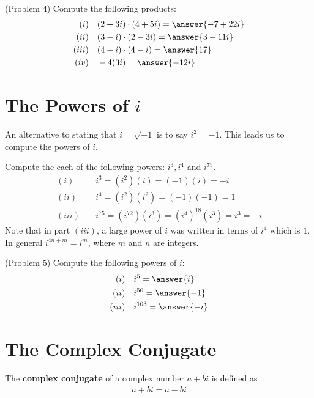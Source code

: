 \documentclass[handout]{ximera}
\begin{document}
\begin{problem}(Problem 4)
Compute the following products:
\begin{align*}
(i)& \quad (2+3i) \cdot (4+5i) = \answer{-7+22i}\\
(ii)& \quad (3-i) \cdot (2-3i) = \answer{3-11i}\\
(iii)& \quad (4+i) \cdot (4-i) = \answer{17}\\
(iv)& \quad -4(3i)= \answer{-12i}
\end{align*}
\end{problem}


\section{The Powers of $i$}
An alternative to stating that $i = \sqrt {-1}$ is to say $i^2 = -1$. This leads us to compute the powers of $i$.

\begin{example}[Example 5]
Compute the each of the following powers: $i^3, i^4$ and $i^{75}$.
\begin{align*}
(i)& \quad i^3 = (i^2)(i) = (-1)(i) =-i\\
(ii)& \quad i^4 = (i^2)(i^2) = (-1)(-1) = 1\\
(iii)& \quad i^{75} = (i^{72})(i^3) = (i^4)^{18} (i^3) = i^3 = -i
\end{align*}
Note that in part $(iii)$, a large power of $i$ was written in terms of $i^4$ which is $1$.
In general $i^{4n+m} = i^m$, where $m$ and $n$ are integers.
\end{example}


\begin{problem}(Problem 5)
Compute the following powers of $i$:
\begin{align*}
(i)& \quad i^5 = \answer{i}\\
(ii)& \quad i^{50} = \answer{-1}\\
(iii)& \quad i^{103}= \answer{-i}
\end{align*}
\end{problem}



\section{The Complex Conjugate}

\begin{definition}
The {\bf complex conjugate} of a complex number $a+bi$ is defined as
\[
\overline {a+bi} = a-bi
\]
\end{definition}
\end{document}
